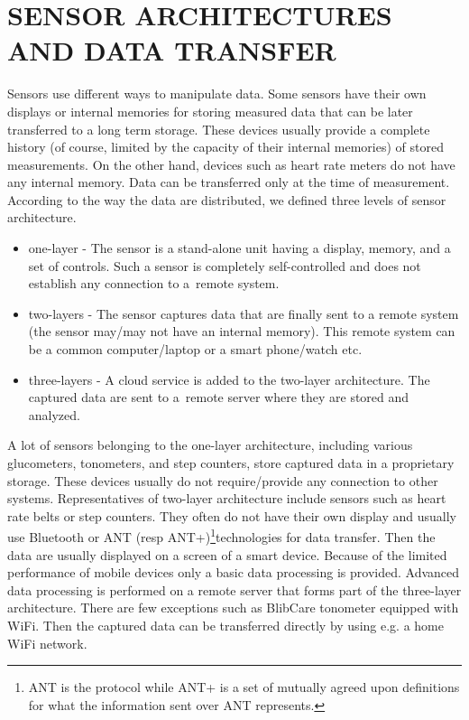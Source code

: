 \documentclass[a4paper,twoside]{article}
\begin{document}
\section{\uppercase{Sensor Architectures and Data Transfer}}
\label{topology_data_transfer}

\noindent
Sensors use different ways to manipulate data. Some sensors have their own displays or internal memories for storing measured data that can be later transferred to a long term storage. These devices usually provide a complete history (of course, limited by the capacity of their internal memories) of stored measurements. On the other hand, devices such as heart rate meters do not have any internal memory. Data can be transferred only at the time of measurement. According to the way the data are distributed, we defined three levels of sensor architecture.

\begin{itemize}
 \item one-layer - The sensor is a stand-alone unit having a display, memory, and a set of controls. Such a sensor is completely self-controlled and does not establish any connection to a~remote system.
 \item two-layers - The sensor captures data that are finally sent to a remote system (the sensor may/may not have an internal memory). This remote system can be a common computer/laptop or a smart phone/watch etc.
 \item three-layers - A cloud service is added to the two-layer architecture. The captured data are sent to a~remote server where they are stored and analyzed.
\end{itemize}

 A lot of sensors belonging to the one-layer architecture, including various glucometers, tonometers, and step counters, store captured data in a proprietary storage. These devices usually do not require/provide any connection to other systems. Representatives of two-layer architecture include sensors such as heart rate belts or  step counters. They often do not have their own display and usually use Bluetooth or ANT (resp ANT+)\footnote{ANT is the protocol while ANT+ is a set of mutually agreed upon definitions for what the information sent over ANT represents.}technologies  for data transfer. Then the data are usually displayed on a screen of a smart device. Because of the limited performance of mobile devices only a basic data processing is provided. Advanced data processing is performed on a remote server that forms part of the three-layer architecture. There are few exceptions such as BlibCare tonometer equipped with WiFi. Then the captured data can be transferred directly by using e.g. a home WiFi network.
\end{document}
